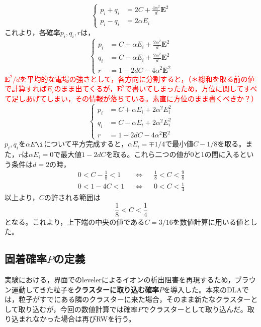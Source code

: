 \documentclass[autodetect-engine,dvi=dvipdfmx,a4paper,ja=standard,oneside,openany,11pt,draft]{bxjsbook}
\begin{document}
\begin{equation}
  \left\{
  \begin{aligned}
    p_i+q_i & =2C+\frac{4\alpha^2}{d}\bm{E}^2 \\
    p_i-q_i & =2\alpha E_i
  \end{aligned}
  \right.
  \label{eq:prob}
\end{equation}
これより，各確率$p_i,q_i,r$は，
\begin{equation}
  \left\{
  \begin{aligned}
    p_i & =C+\alpha E_i+\frac{2\alpha^2}{d}\bm{E}^2 \\
    q_i & =C-\alpha E_i+\frac{2\alpha^2}{d}\bm{E}^2 \\
    r   & =1-2dC-4\alpha^2\bm{E}^2
  \end{aligned}
  \right.
  \label{eq:prob2}
\end{equation}
\textcolor{red}{$\bm{E}^2/d$を平均的な電場の強さとして，各方向に分割すると，（＊総和を取る前の値で計算すれば$E_i$のまま出てくるが，$\bm{E}^2$で書いてしまったため，方位に関してすべて足しあげてしまい，その情報が落ちている。素直に方位のまま書くべきか？）}
\begin{equation}
  \left\{
  \begin{aligned}
    p_i & =C+\alpha E_i+2\alpha^2 E_i^2 \\
    q_i & =C-\alpha E_i+2\alpha^2 E_i^2 \\
    r   & =1-2dC-4\alpha^2\bm{E}^2
  \end{aligned}
  \right.
  \label{eq:prob3}
\end{equation}
$p_i,q_i$を$\alpha E\i$について平方完成すると，$\alpha E_i=\mp1/4$で最小値$C-1/8$を取る。また，$r$は$\alpha E_i=0$で最大値$1-2dC$を取る。これら二つの値が0と1の間に入るという条件は$d=2$の時，
\begin{align}
  0<C-\frac{1}{8}<1 &  & \Leftrightarrow &  & \frac{1}{8}<C<\frac{9}{8} \\
  0<1-4C<1          &  & \Leftrightarrow &  & 0<C<\frac{1}{4}
  \label{eq:condition}
\end{align}
以上より，$C$の許される範囲は
\begin{equation}
  \frac{1}{8}<C<\frac{1}{4}
  \label{eq:condition2}
\end{equation}
となる。これより，上下端の中央の値である$C=3/16$を数値計算に用いる値とした。
\subsection{固着確率$P$の定義}
実験における，界面でのlevelerによるイオンの析出阻害を再現するため，ブラウン運動してきた粒子を\textbf{クラスターに取り込む確率$P$}を導入した。本来のDLAでは，粒子がすでにある隣のクラスターに来た場合，そのまま新たなクラスターとして取り込むが，今回の数値計算では確率$P$でクラスターとして取り込んだ。取り込まれなかった場合は再びRWを行う。
\end{document}
